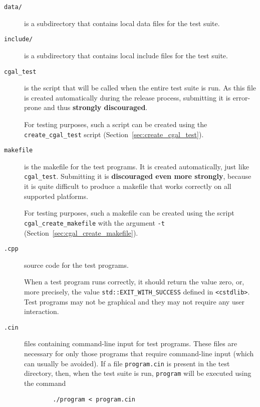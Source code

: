 \begin{description}
   \item[{\tt data/}] is a subdirectory that contains local data files for the
        test suite.
   \item[{\tt include/}] is a subdirectory that contains local include files for
        the test suite.
      \item[{\tt cgal\_test}] is the script that will be called when the entire
        test suite is run. As this file is created automatically
        during the release process, submitting it is error-prone and
        thus {\bf strongly discouraged}.
        
        For testing purposes, such a script can be created using the
        {\tt create\_cgal\_test}%
        script (Section~\ref{sec:create_cgal_test}).  

   \item[{\tt makefile}] 
        is the makefile for the test programs. It is created
        automatically, just like {\tt cgal\_test}. Submitting it is 
        {\bf discouraged even more strongly}, because it is quite difficult 
        to produce a makefile that works correctly on all supported platforms.
        
        For testing purposes, such a makefile can be created using the
        script
        {\tt cgal\_create\_makefile}%
        with the argument {\tt -t} 
        (Section~\ref{sec:cgal_create_makefile}).
   \item[{\tt *.cpp}] source code for the test programs.

        When a test program runs correctly, it should return
         the
        value zero, or, more precisely, the value \verb|std::EXIT_WITH_SUCCESS|
        defined in \verb|<cstdlib>|.
        Test programs may not be graphical and they may not require any user 
        interaction.   
   \item[{\tt *.cin}] files containing command-line input for 
        test programs.  These files are necessary for only those programs 
        that require command-line input (which can usually be avoided).  
        If a file \texttt{program.cin} is 
        present in the test directory, then, when the test suite is run,
        \texttt{program} will be executed using the command
        \begin{verbatim}
        ./program < program.cin
        \end{verbatim}
\end{description} 

